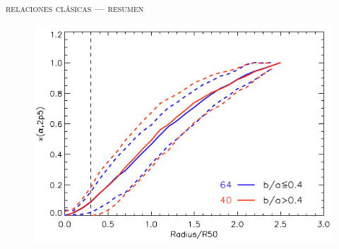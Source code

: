 \documentclass[xcolor=dvipsnames,4pt,hyperref={colorlinks,citecolor=black,linkcolor=black,urlcolor=black}]{beamer}
\begin{document}
\begin{frame}{\textsc{relaciones clásicas --- resumen}}%


\begin{figure}
\includegraphics[scale=1]{img/iglesias-paramo2013-1}
\end{figure}

\end{frame}
\end{document}
